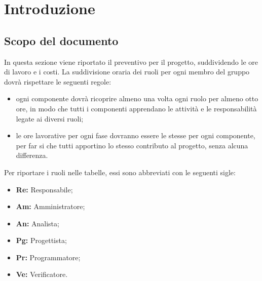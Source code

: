 \section{Introduzione}\label{section:introduzione}

\subsection{Scopo del documento}
In questa sezione viene riportato il preventivo per il progetto, suddividendo le ore di lavoro e i costi.
La suddivisione oraria dei ruoli per ogni membro del gruppo dovrà rispettare le seguenti regole:
\begin{itemize}
	\item ogni componente dovrà ricoprire almeno una volta ogni ruolo per almeno otto ore, in modo che tutti i componenti apprendano le attività e le responsabilità legate ai diversi ruoli;
	\item le ore lavorative per ogni fase dovranno essere le stesse per ogni componente, per far si che tutti apportino lo stesso contributo al progetto, senza alcuna differenza.
\end{itemize}
Per riportare i ruoli nelle tabelle, essi sono abbreviati con le seguenti sigle:
\begin{itemize}
	\item\textbf{Re:} Responsabile;
	\item\textbf{Am:} Amministratore;
	\item\textbf{An:} Analista;
	\item\textbf{Pg:} Progettista;
	\item\textbf{Pr:} Programmatore;
	\item\textbf{Ve:} Verificatore.
\end{itemize}





